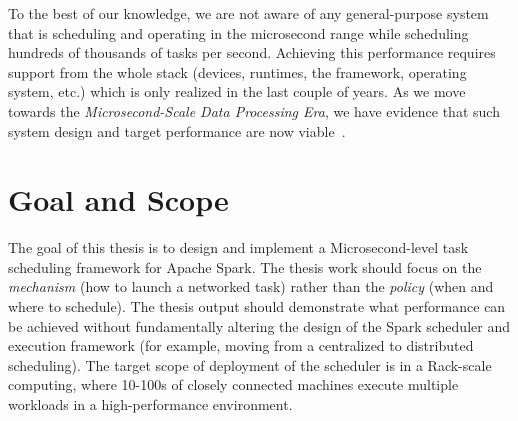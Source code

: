 \documentclass[10pt,a4paper]{article}
\begin{document}
To the best of our knowledge, we are not aware of any
general-purpose system that is scheduling and operating in the 
microsecond range while scheduling hundreds of thousands of tasks 
per second.
Achieving this performance requires support from the whole stack 
(devices, runtimes, the framework, operating system, etc.) which is 
only realized in the last couple of years. As we move towards 
the \textit{Microsecond-Scale Data Processing Era}, we have evidence 
that such system design and target performance are now
viable~\cite{2017-sosp-zygos,2017-killer}.

% 
% 


\section*{Goal and Scope}
The goal of this thesis is to design and implement a Microsecond-level
task scheduling framework for Apache Spark. The thesis work should focus on 
the \textit{mechanism} (how to launch a networked task) rather than the 
\textit{policy} (when and where to schedule). The thesis output should 
demonstrate what performance can be achieved without fundamentally altering 
the design of the Spark scheduler and execution framework (for example, 
moving from a centralized to distributed scheduling). The target scope of
deployment of the scheduler is in a Rack-scale computing, where 10-100s 
of closely connected machines execute multiple workloads in a 
high-performance environment. 
  
\end{document}
